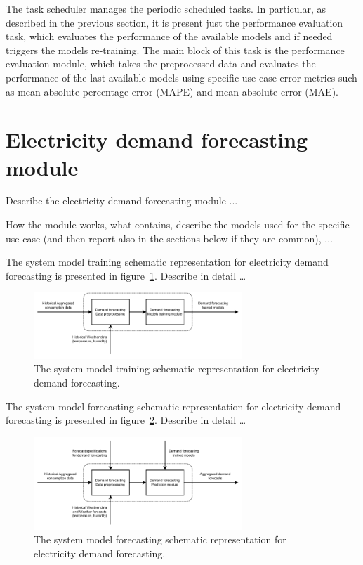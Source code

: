 The task scheduler manages the periodic scheduled tasks.
In particular, as described in the previous section, it is present just the performance evaluation task, which evaluates the performance of the available models and if needed triggers the models re-training.
The main block of this task is the performance evaluation module, which takes the preprocessed data and evaluates the performance of the last available models using specific use case error metrics such as mean absolute percentage error (MAPE) and mean absolute error (MAE).


\section{Electricity demand forecasting module}
\label{sec:demandmodel}
\vspace{0.2 cm}

Describe the electricity demand forecasting module ...

How the module works, what contains, describe the models used for the specific use case (and then report also in the sections below if they are common), ...


The system model training schematic representation for electricity demand forecasting is presented in figure~\ref{fig:modeltrainingdemand}.
Describe in detail …

\begin{figure}[H]
\centering
\includegraphics[width=0.7\textwidth]{images/system_model_training_demand}
\caption{The system model training schematic representation for electricity demand forecasting.}
\label{fig:modeltrainingdemand}
\end{figure}

The system model forecasting schematic representation for electricity demand forecasting is presented in figure~\ref{fig:modelforecastingdemand}.
Describe in detail …

\begin{figure}[H]
\centering
\includegraphics[width=0.7\textwidth]{images/system_model_forecasting_demand}
\caption{The system model forecasting schematic representation for electricity demand forecasting.}
\label{fig:modelforecastingdemand}
\end{figure}


